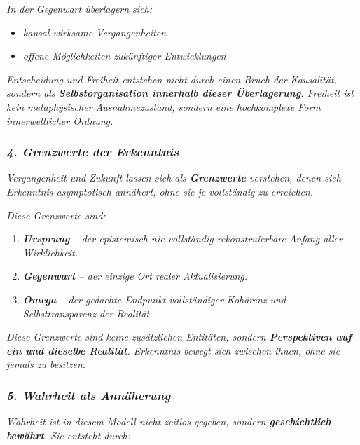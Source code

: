 \documentclass[
]{article}
\begin{document}
\emph{In der Gegenwart überlagern sich:}

\begin{itemize}
\item
  \emph{kausal wirksame Vergangenheiten}
\item
  \emph{offene Möglichkeiten zukünftiger Entwicklungen}
\end{itemize}

\emph{Entscheidung und Freiheit entstehen nicht durch einen Bruch der Kausalität, sondern als \textbf{Selbstorganisation innerhalb dieser Überlagerung}. Freiheit ist kein metaphysischer Ausnahmezustand, sondern eine hochkomplexe Form innerweltlicher Ordnung.}

\subsubsection{\texorpdfstring{\emph{\textbf{4. Grenzwerte der Erkenntnis}}}{4. Grenzwerte der Erkenntnis}}\label{grenzwerte-der-erkenntnis}

\emph{Vergangenheit und Zukunft lassen sich als \textbf{Grenzwerte} verstehen, denen sich Erkenntnis asymptotisch annähert, ohne sie je vollständig zu erreichen.}

\emph{Diese Grenzwerte sind:}

\begin{enumerate}
\def\labelenumi{\arabic{enumi}.}
\item
  \emph{\textbf{Ursprung} -- der epistemisch nie vollständig rekonstruierbare Anfang aller Wirklichkeit.}
\item
  \emph{\textbf{Gegenwart} -- der einzige Ort realer Aktualisierung.}
\item
  \emph{\textbf{Omega} -- der gedachte Endpunkt vollständiger Kohärenz und Selbsttransparenz der Realität.}
\end{enumerate}

\emph{Diese Grenzwerte sind keine zusätzlichen Entitäten, sondern \textbf{Perspektiven auf ein und dieselbe Realität}. Erkenntnis bewegt sich zwischen ihnen, ohne sie jemals zu besitzen.}

\subsubsection{\texorpdfstring{\emph{\textbf{5. Wahrheit als Annäherung}}}{5. Wahrheit als Annäherung}}\label{wahrheit-als-annuxe4herung}

\emph{Wahrheit ist in diesem Modell nicht zeitlos gegeben, sondern \textbf{geschichtlich bewährt}. Sie entsteht durch:}
\end{document}
